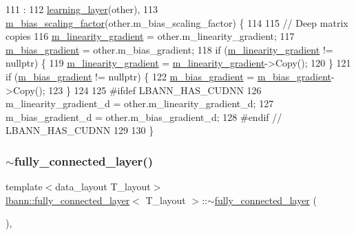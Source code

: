 \begin{DoxyCode}
111                                                             :
112     \hyperlink{classlbann_1_1learning__layer_a818a96b1d3daabb22b1e82c1c54c6268}{learning\_layer}(other),
113     \hyperlink{classlbann_1_1fully__connected__layer_ae02eaffd5528bf572883f8b06d1b40c0}{m\_bias\_scaling\_factor}(other.m\_bias\_scaling\_factor) \{
114     
115     \textcolor{comment}{// Deep matrix copies}
116     \hyperlink{classlbann_1_1fully__connected__layer_ab80f9cb94662ce4d90aa6d8b5cfa0803}{m\_linearity\_gradient} = other.m\_linearity\_gradient;
117     \hyperlink{classlbann_1_1fully__connected__layer_a6510917c573378f40789a1d16db22b4e}{m\_bias\_gradient} = other.m\_bias\_gradient;
118     \textcolor{keywordflow}{if} (\hyperlink{classlbann_1_1fully__connected__layer_ab80f9cb94662ce4d90aa6d8b5cfa0803}{m\_linearity\_gradient} != \textcolor{keyword}{nullptr}) \{
119       \hyperlink{classlbann_1_1fully__connected__layer_ab80f9cb94662ce4d90aa6d8b5cfa0803}{m\_linearity\_gradient} = \hyperlink{classlbann_1_1fully__connected__layer_ab80f9cb94662ce4d90aa6d8b5cfa0803}{m\_linearity\_gradient}->Copy();
120     \}
121     \textcolor{keywordflow}{if} (\hyperlink{classlbann_1_1fully__connected__layer_a6510917c573378f40789a1d16db22b4e}{m\_bias\_gradient} != \textcolor{keyword}{nullptr}) \{
122       \hyperlink{classlbann_1_1fully__connected__layer_a6510917c573378f40789a1d16db22b4e}{m\_bias\_gradient} = \hyperlink{classlbann_1_1fully__connected__layer_a6510917c573378f40789a1d16db22b4e}{m\_bias\_gradient}->Copy();
123     \}
124 
125 \textcolor{preprocessor}{#ifdef LBANN\_HAS\_CUDNN}
126     m\_linearity\_gradient\_d = other.m\_linearity\_gradient\_d;
127     m\_bias\_gradient\_d = other.m\_bias\_gradient\_d;
128 \textcolor{preprocessor}{#endif // LBANN\_HAS\_CUDNN}
129 
130   \}
\end{DoxyCode}
\mbox{\label{classlbann_1_1fully__connected__layer_a5b133629f448a289bba6ebb6ab13941d}} 
\subsubsection{\texorpdfstring{$\sim$fully\+\_\+connected\+\_\+layer()}{~fully\_connected\_layer()}}
{\footnotesize\ttfamily template$<$data\+\_\+layout T\+\_\+layout$>$ \\
\hyperlink{classlbann_1_1fully__connected__layer}{lbann\+::fully\+\_\+connected\+\_\+layer}$<$ T\+\_\+layout $>$\+::$\sim$\hyperlink{classlbann_1_1fully__connected__layer}{fully\+\_\+connected\+\_\+layer} (\begin{DoxyParamCaption}{ }\end{DoxyParamCaption})\hspace{0.3cm}{\ttfamily [inline]}, {\ttfamily [override]}}



